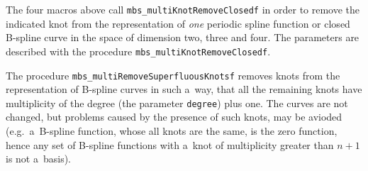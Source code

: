 \vspace{\bigskipamount}
The four macros above call \texttt{mbs\_multiKnotRemoveClosedf} in order to
remove the indicated knot from the representation of \emph{one} periodic
spline function or closed B-spline curve in the space of dimension
two, three and four. The parameters are described with the procedure
\texttt{mbs\_multiKnotRemoveClosedf}.


\vspace{\bigskipamount}
\begin{sloppypar}
The procedure \texttt{mbs\_multiRemoveSuperfluousKnotsf} removes knots
from the representation of B-spline curves in such a~way, that all
the remaining knots have multiplicity of the degree (the parameter
\texttt{degree}) plus one. The curves are not changed, but problems caused
by the presence of such knots, may be avioded (e.g.\
a~B-spline function, whose all knots are the same, is the zero function,
hence any set of B-spline functions with a~knot of multiplicity
greater than $n+1$ is not a~basis).
\end{sloppypar}

